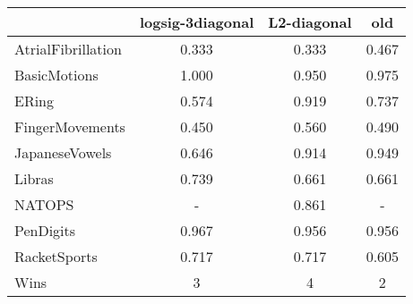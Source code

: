\begin{tabular}{lccc}
\toprule
{} &  logsig-3diagonal &  L2-diagonal &   old \\
\midrule
AtrialFibrillation &             0.333 &        0.333 & 0.467 \\
BasicMotions       &             1.000 &        0.950 & 0.975 \\
ERing              &             0.574 &        0.919 & 0.737 \\
FingerMovements    &             0.450 &        0.560 & 0.490 \\
JapaneseVowels     &             0.646 &        0.914 & 0.949 \\
Libras             &             0.739 &        0.661 & 0.661 \\
NATOPS             &                 - &        0.861 &     - \\
PenDigits          &             0.967 &        0.956 & 0.956 \\
RacketSports       &             0.717 &        0.717 & 0.605 \\ 
\midrule
Wins &                 3 &            4 &    2 \\
\bottomrule
\end{tabular}

